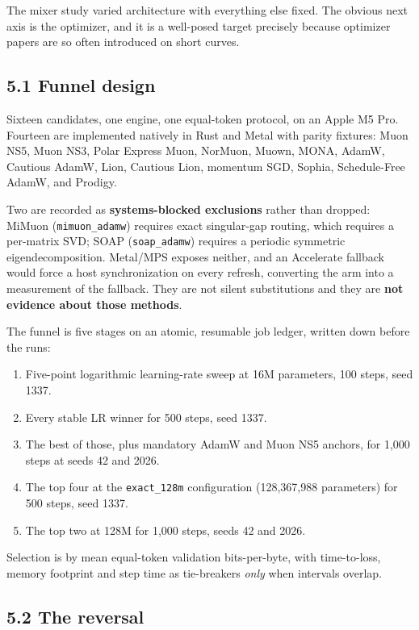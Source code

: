 The mixer study varied architecture with everything else fixed. The obvious next axis is the
optimizer, and it is a well-posed target precisely because optimizer papers are so often
introduced on short curves.

\subsection{5.1 Funnel design}\label{funnel-design}

Sixteen candidates, one engine, one equal-token protocol, on an Apple M5 Pro. Fourteen are
implemented natively in Rust and Metal with parity fixtures: Muon NS5, Muon NS3, Polar Express
Muon, NorMuon, Muown, MONA, AdamW, Cautious AdamW, Lion, Cautious Lion, momentum SGD, Sophia,
Schedule-Free AdamW, and Prodigy.

Two are recorded as \textbf{systems-blocked exclusions} rather than dropped: MiMuon (\texttt{mimuon\_adamw}) requires exact
singular-gap routing, which requires a per-matrix SVD; SOAP (\texttt{soap\_adamw}) requires a periodic symmetric
eigendecomposition. Metal/MPS exposes neither, and an Accelerate fallback would force a host
synchronization on every refresh, converting the arm into a measurement of the fallback. They are
not silent substitutions and they are \textbf{not evidence about those methods}.

The funnel is five stages on an atomic, resumable job ledger, written down before the runs:

\begin{enumerate}
\def\labelenumi{\arabic{enumi}.}
\tightlist
\item
  Five-point logarithmic learning-rate sweep at 16M parameters, 100 steps, seed 1337.
\item
  Every stable LR winner for 500 steps, seed 1337.
\item
  The best of those, plus mandatory AdamW and Muon NS5 anchors, for 1,000 steps at seeds 42 and 2026.
\item
  The top four at the \texttt{exact\_128m} configuration (128,367,988 parameters) for 500 steps, seed 1337.
\item
  The top two at 128M for 1,000 steps, seeds 42 and 2026.
\end{enumerate}

Selection is by mean equal-token validation bits-per-byte, with time-to-loss, memory footprint
and step time as tie-breakers \emph{only} when intervals overlap.

\subsection{5.2 The reversal}\label{the-reversal}

